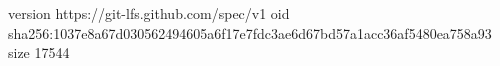 version https://git-lfs.github.com/spec/v1
oid sha256:1037e8a67d030562494605a6f17e7fdc3ae6d67bd57a1acc36af5480ea758a93
size 17544
